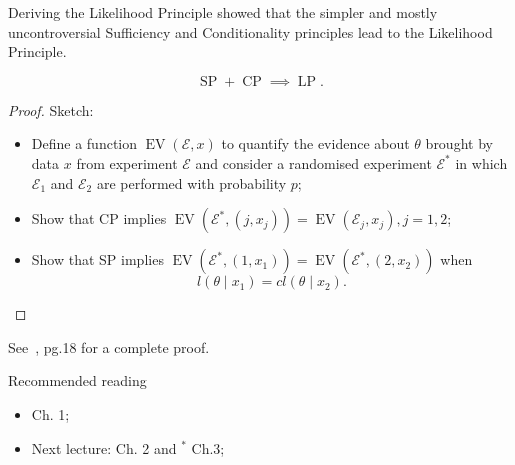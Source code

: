 \begin{frame}{Deriving the Likelihood Principle}
\cite{Birnbaum1962} showed that the simpler and mostly uncontroversial Sufficiency and Conditionality principles lead to the Likelihood Principle.
\begin{theo}
\label{thm:Birnbaum}
 \begin{equation}
  \operatorname{SP} + \operatorname{CP} \implies \operatorname{LP}.
 \end{equation}
\end{theo}
\begin{proof}
 Sketch:
 \begin{itemize}
  \item Define a function $\operatorname{EV}(\mathcal{E}, x)$ to quantify the evidence about $\theta$ brought by data $x$ from experiment $\mathcal{E}$ and consider a randomised experiment $\mathcal{E}^*$ in which $\mathcal{E}_1$ and $\mathcal{E}_2$ are performed with probability $p$;
  \item Show that CP implies
  $\operatorname{EV}(\mathcal{E}^*, (j, x_j)) = \operatorname{EV}(\mathcal{E}_j, x_j), j = 1, 2$;
  \item Show that SP implies
  $\operatorname{EV}(\mathcal{E}^*, (1, x_1)) = \operatorname{EV}(\mathcal{E}^*, (2, x_2))$ when
  $$ l(\theta \mid x_1) = c l(\theta \mid x_2).$$
 \end{itemize}
\end{proof}
See~\cite{Robert2007}, pg.18 for a complete proof.
\end{frame}
\begin{frame}{Recommended reading}
\begin{itemize}
 \item[\faBook] \cite{Robert2007} Ch. 1;
 \item[\faForward] Next lecture: \cite{Robert2007} Ch. 2 and $^\ast$ \cite{Schervish2012} Ch.3;
 \end{itemize} 
\end{frame}
